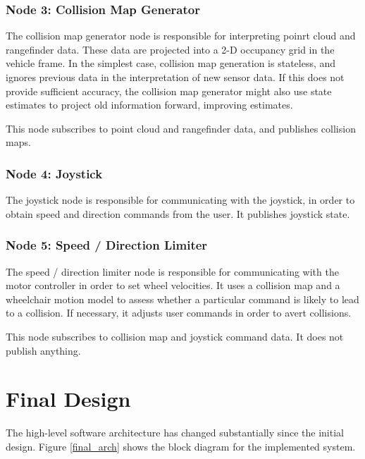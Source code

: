 \documentclass[oneside,final,a4paper]{report}
\begin{document}
\subsubsection{Node 3: Collision Map Generator}
The collision map generator node is responsible for interpreting poinrt cloud and rangefinder data.  These data are projected into a 2-D occupancy grid in the vehicle frame.  In the simplest case, collision map generation is stateless, and ignores previous data in the interpretation of new sensor data.  If this does not provide sufficient accuracy, the collision map generator might also use state estimates to project old information forward, improving estimates.  

This node subscribes to point cloud and rangefinder data, and publishes collision maps.

\subsubsection{Node 4: Joystick}
The joystick node is responsible for communicating with the joystick, in order to obtain speed and direction commands from the user.  It publishes joystick state.

\subsubsection{Node 5: Speed / Direction Limiter}
The speed / direction limiter node is responsible for communicating with the motor controller in order to set wheel velocities.  It uses a collision map and a wheelchair motion model to assess whether a particular command is likely to lead to a collision.  If necessary, it adjusts user commands in order to avert collisions.

This node subscribes to collision map and joystick command data.  It does not publish anything.

\section{Final Design}
The high-level software architecture has changed substantially since the initial design. Figure \ref{final_arch} shows the block diagram for the implemented system.
\end{document}
